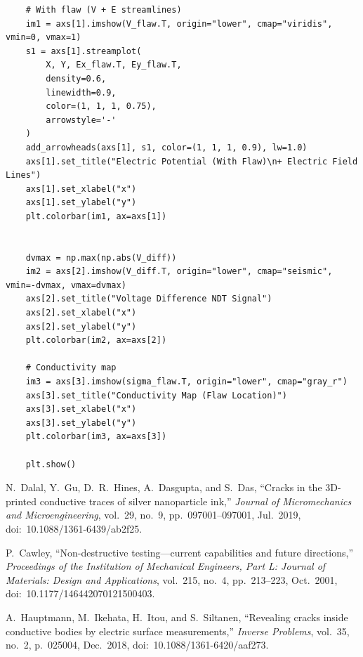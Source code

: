 \documentclass[reprint,amsmath,amssymb,aps]{revtex4-2}
\begin{document}
\begin{lstlisting}
    # With flaw (V + E streamlines)
    im1 = axs[1].imshow(V_flaw.T, origin="lower", cmap="viridis", vmin=0, vmax=1)
    s1 = axs[1].streamplot(
        X, Y, Ex_flaw.T, Ey_flaw.T,
        density=0.6,
        linewidth=0.9,
        color=(1, 1, 1, 0.75),
        arrowstyle='-'
    )
    add_arrowheads(axs[1], s1, color=(1, 1, 1, 0.9), lw=1.0)
    axs[1].set_title("Electric Potential (With Flaw)\n+ Electric Field Lines")
    axs[1].set_xlabel("x")
    axs[1].set_ylabel("y")
    plt.colorbar(im1, ax=axs[1])
    
    
    dvmax = np.max(np.abs(V_diff))
    im2 = axs[2].imshow(V_diff.T, origin="lower", cmap="seismic", vmin=-dvmax, vmax=dvmax)
    axs[2].set_title("Voltage Difference NDT Signal")
    axs[2].set_xlabel("x")
    axs[2].set_ylabel("y")
    plt.colorbar(im2, ax=axs[2])
    
    # Conductivity map
    im3 = axs[3].imshow(sigma_flaw.T, origin="lower", cmap="gray_r")
    axs[3].set_title("Conductivity Map (Flaw Location)")
    axs[3].set_xlabel("x")
    axs[3].set_ylabel("y")
    plt.colorbar(im3, ax=axs[3])
    
    plt.show()
\end{lstlisting}

\begin{thebibliography}{}
N.~Dalal, Y.~Gu, D.~R.~Hines, A.~Dasgupta, and S.~Das,
``Cracks in the 3D-printed conductive traces of silver nanoparticle ink,'' \textit{Journal of Micromechanics and Microengineering}, vol.~29, no.~9, pp.~097001--097001, Jul.~2019, doi:~10.1088/1361-6439/ab2f25.

P.~Cawley, ``Non-destructive testing---current capabilities and future directions,'' \textit{Proceedings of the Institution of Mechanical Engineers, Part L: Journal of Materials: Design and Applications}, vol.~215, no.~4, pp.~213--223, Oct.~2001,
doi:~10.1177/146442070121500403.

A.~Hauptmann, M.~Ikehata, H.~Itou, and S.~Siltanen,
``Revealing cracks inside conductive bodies by electric surface measurements,'' \textit{Inverse Problems}, vol.~35, no.~2, p.~025004, Dec.~2018, doi:~10.1088/1361-6420/aaf273.

\end{thebibliography}
\end{document}
